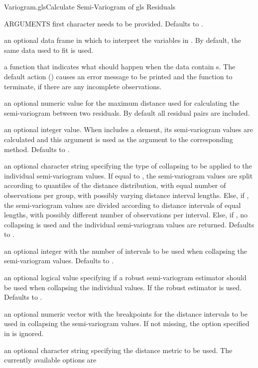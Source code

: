 \documentclass[pdftex]{article} \usepackage{url,graphicx}
\begin{document}
\begin{Helpfile}{Variogram.gls}{Calculate Semi-Variogram of gls Residuals}
\begin{Argument}{ARGUMENTS}
first character needs to be provided. Defaults to .
\item[\Co{data:}]
an optional data frame in which to interpret the variables
in . By default, the same data used to fit 
is used.
\item[\Co{na.action:}]
a function that indicates what should happen when the
data contain s. The default action () causes
an error message to be printed and the function to terminate, if there
are any incomplete observations.
\item[\Co{maxDist:}]
an optional numeric value for the maximum distance used
for calculating the semi-variogram between two residuals. By default
all residual pairs are included.
\item[\Co{length.out:}]
an optional integer value. When 
includes a  element, its semi-variogram values are
calculated and this argument is used as the 
argument to the corresponding  method. Defaults to
.
\item[\Co{collapse:}]
an optional character string specifying the type of
collapsing to be applied to the individual semi-variogram values. If
equal to , the semi-variogram values are split
according to quantiles of the distance distribution, with equal
number of observations per group, with possibly varying distance
interval lengths. Else, if , the semi-variogram values
are divided according to distance intervals of equal lengths, with
possibly different number of observations per interval. Else, if
, no collapsing is used and the individual
semi-variogram values are returned. Defaults to .
\item[\Co{nint:}]
an optional integer with the number of intervals to be
used when collapsing the semi-variogram values. Defaults to .
\item[\Co{robust:}]
an optional logical value specifying if a robust
semi-variogram estimator should be used when collapsing the
individual values. If  the robust estimator is
used. Defaults to .
\item[\Co{breaks:}]
an optional numeric vector with the breakpoints for the
distance intervals to be used in collapsing the semi-variogram
values. If not missing, the option specified in  is
ignored.
\item[\Co{metric:}]
an optional character string specifying the distance
metric to be used. The currently available options are

\end{Argument}
\end{Helpfile}
\end{document}
